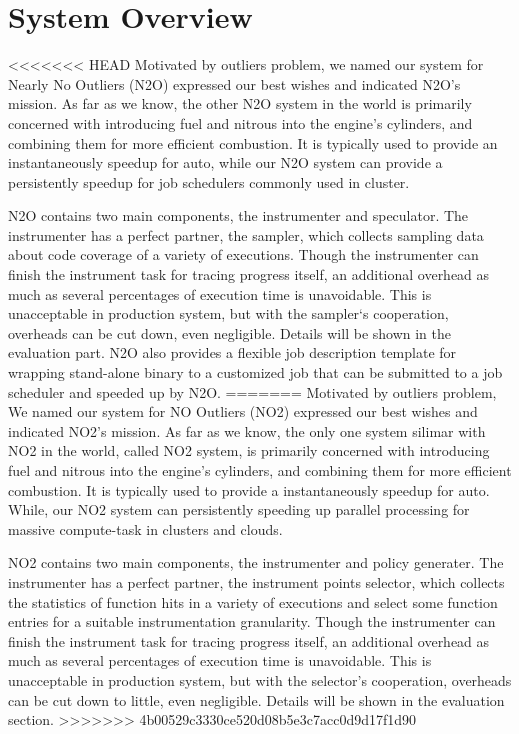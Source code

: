 \section{System Overview}

<<<<<<< HEAD
Motivated by outliers problem, we named our system for Nearly No Outliers (N2O) expressed our best wishes and indicated N2O’s mission. As far as we know, the other N2O system in the world is primarily concerned with introducing fuel and nitrous into the engine's cylinders, and combining them for more efficient combustion. It is typically used to provide an instantaneously speedup for auto, while our N2O system can provide a persistently speedup for job schedulers commonly used in cluster.

N2O contains two main components, the instrumenter and speculator. The instrumenter has a perfect partner, the sampler, which collects sampling data about code coverage of a variety of executions. Though the instrumenter can finish the instrument task for tracing progress itself, an additional overhead as much as several percentages of execution time is unavoidable. This is unacceptable in production system, but with the sampler‘s cooperation, overheads can be cut down, even negligible. Details will be shown in the evaluation part. N2O also provides a flexible job description template for wrapping stand-alone binary to a customized job that can be submitted to a job scheduler and speeded up by N2O.
=======
Motivated by outliers problem, We named our system for NO Outliers (NO2) expressed our best wishes and indicated NO2’s mission. As far as we know, the only one system silimar with NO2 in the world, called NO2 system, is primarily concerned with introducing fuel and nitrous into the engine's cylinders, and combining them for more efficient combustion. It is typically used to provide a instantaneously speedup for auto. While, our NO2 system can persistently speeding up parallel processing for massive compute-task in clusters and clouds.

NO2 contains two main components, the instrumenter and policy generater. The instrumenter has a perfect partner, the instrument points selector, which collects the statistics of function hits in a variety of executions and select some function entries for a suitable instrumentation granularity. Though the instrumenter can finish the instrument task for tracing progress itself, an additional overhead as much as several percentages of execution time is unavoidable. This is unacceptable in production system, but with the selector's cooperation, overheads can be cut down to little, even negligible. Details will be shown in the evaluation section. 
>>>>>>> 4b00529c3330ce520d08b5e3c7acc0d9d17f1d90

